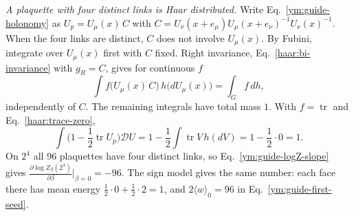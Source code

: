 \emph{A plaquette with four distinct links is Haar distributed.} Write
Eq.~\eqref{ym:guide-holonomy} as $U_p=U_\mu(x)\,C$ with
$C=U_\nu(x+e_\mu)U_\mu(x+e_\nu)^{-1}U_\nu(x)^{-1}$. When the four links are
distinct, $C$ does not involve $U_\mu(x)$. By Fubini, integrate over
$U_\mu(x)$ first with $C$ fixed. Right invariance,
Eq.~\eqref{haar:bi-invariance} with $g_R=C$, gives for continuous $f$
\begin{equation}\label{ym:guide-plaquette-haar}
 \int f\big(U_\mu(x)\,C\big)\,h\big(dU_\mu(x)\big)=\int_G f\,dh ,
\end{equation}
independently of $C$. The remaining integrals have total mass $1$. With
$f=\operatorname{tr}$ and Eq.~\eqref{haar:trace-zero},
\begin{equation}\label{ym:guide-plaquette-mean}
 \int\Big(1-\frac12\operatorname{tr}U_p\Big)\mathcal DU
 =1-\frac12\int\operatorname{tr}V\,h(dV)=1-\frac12\cdot0=1 .
\end{equation}
On $2^4$ all 96 plaquettes have four distinct links, so
Eq.~\eqref{ym:guide-logZ-slope} gives
$\frac{\partial\log Z_\beta(2^4)}{\partial\beta}\big|_{\beta=0}=-96$. The
sign model gives the same number: each face there has mean energy
$\tfrac12\cdot0+\tfrac12\cdot2=1$, and $2\langle w\rangle_0=96$ in
Eq.~\eqref{ym:guide-first-seed}.

